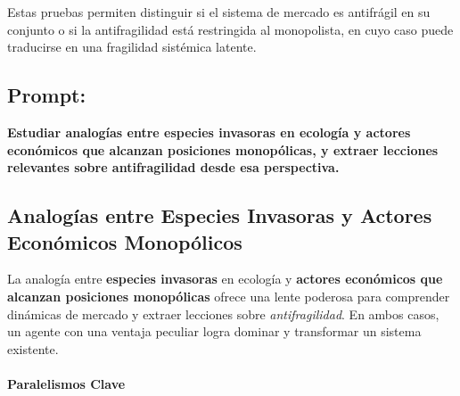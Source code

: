 \documentclass[a4paper,12pt]{article}
\begin{document}
Estas pruebas permiten distinguir si el sistema de mercado es antifrágil en su conjunto o si la antifragilidad está restringida al monopolista, en cuyo caso puede traducirse en una fragilidad sistémica latente.


\subsection*{Prompt:}
\textbf{Estudiar analogías entre especies invasoras en ecología y actores económicos que alcanzan posiciones monopólicas, y extraer lecciones relevantes sobre antifragilidad desde esa perspectiva.}
\subsection*{Analogías entre Especies Invasoras y Actores Económicos Monopólicos}

La analogía entre \textbf{especies invasoras} en ecología y \textbf{actores económicos que alcanzan posiciones monopólicas} ofrece una lente poderosa para comprender dinámicas de mercado y extraer lecciones sobre \textit{antifragilidad}. En ambos casos, un agente con una ventaja peculiar logra dominar y transformar un sistema existente.

\paragraph{Paralelismos Clave}
\end{document}

